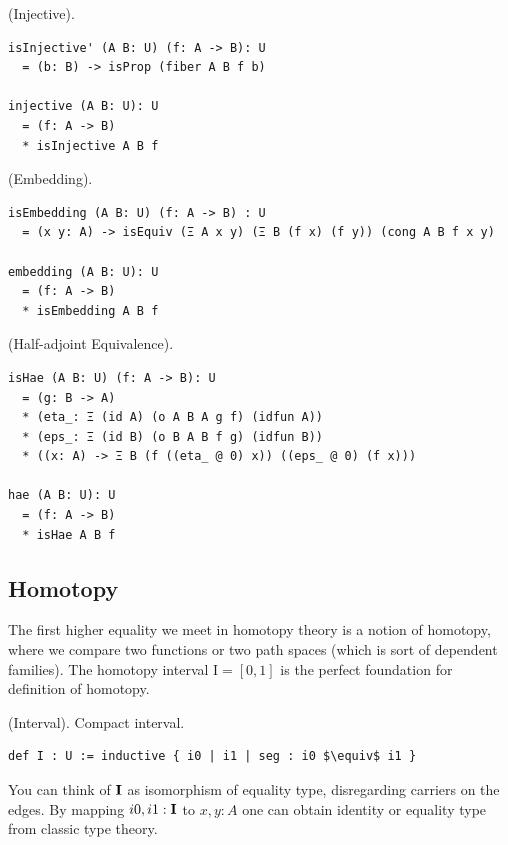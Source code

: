 \documentclass{article}
\begin{document}
\begin{definition} (Injective).
\begin{lstlisting}
isInjective' (A B: U) (f: A -> B): U
  = (b: B) -> isProp (fiber A B f b)

injective (A B: U): U
  = (f: A -> B)
  * isInjective A B f
\end{lstlisting}
\end{definition}

\begin{definition} (Embedding).
\begin{lstlisting}
isEmbedding (A B: U) (f: A -> B) : U
  = (x y: A) -> isEquiv (Ξ A x y) (Ξ B (f x) (f y)) (cong A B f x y)

embedding (A B: U): U
  = (f: A -> B)
  * isEmbedding A B f
\end{lstlisting}
\end{definition}

\begin{definition} (Half-adjoint Equivalence).
\begin{lstlisting}
isHae (A B: U) (f: A -> B): U
  = (g: B -> A)
  * (eta_: Ξ (id A) (o A B A g f) (idfun A))
  * (eps_: Ξ (id B) (o B A B f g) (idfun B))
  * ((x: A) -> Ξ B (f ((eta_ @ 0) x)) ((eps_ @ 0) (f x)))

hae (A B: U): U
  = (f: A -> B)
  * isHae A B f
\end{lstlisting}
\end{definition}

\newpage
\subsection{Homotopy}

The first higher equality we meet in homotopy theory is a notion of homotopy,
where we compare two functions or two path spaces (which is sort of dependent families).
The homotopy interval $\mathrm{I}=[0,1]$ is the perfect foundation for definition of homotopy.

\begin{definition} (Interval). Compact interval.
\begin{lstlisting}[mathescape=true]
def I : U := inductive { i0 | i1 | seg : i0 $\equiv$ i1 }
\end{lstlisting}
\end{definition}

You can think of ${\bf I}$ as isomorphism of equality type,
disregarding carriers on the edges. By mapping $i0,i1:{\bf I}$ to $x,y:A$ one can
obtain identity or equality type from classic type theory.
\end{document}
